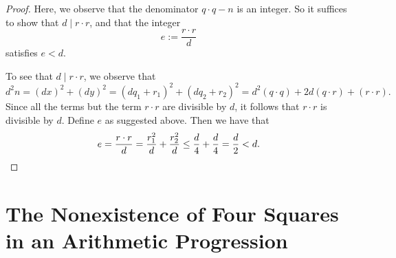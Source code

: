 \begin{proof}
  Here, we observe that the denominator $q\cdot q-n$ is an integer. So it suffices to show that $d\mid r\cdot r$, and that the integer
  \begin{equation*}
    e:= \frac{r\cdot r}{d}
  \end{equation*}
  satisfies $e<d$.

  To see that $d\mid r\cdot r$, we observe that
  \begin{equation*}
    d^2n= (dx)^2+(dy)^2=(dq_1+r_1)^2+(dq_2+r_2)^2= d^2(q\cdot q)+2d(q\cdot r)+ (r\cdot r).
  \end{equation*}
  Since all the terms but the term $r\cdot r$ are divisible by $d$, it follows that $r\cdot r$ is divisible by $d$. Define $e$ as suggested above. Then we have that
  \begin{equation*}
    e=\frac{r\cdot r}{d}=\frac{r_1^2}{d}+\frac{r_2^2}{d}\leq \frac{d}{4}+\frac{d}{4}=\frac{d}{2}<d.\qedhere
  \end{equation*}
\end{proof}

\section{The Nonexistence of Four Squares in an Arithmetic Progression}


